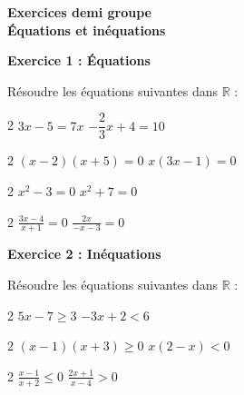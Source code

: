 \documentclass[12pt,a4paper]{exam}
\begin{document}
\begin{center}
    \Large\textbf{Exercices demi groupe\\Équations et inéquations}
\end{center}

\vspace{5pt}

\noindent
\textbf{Exercice 1 : Équations}

\vspace{5pt}
Résoudre les équations suivantes dans $\mathbb{R}$ :
\vspace{-5pt}
\begin{questions}
\begin{multicols}{2}
    \question $3x - 5 = 7x$
    \question $-\dfrac{2}{3}x + 4 = 10$
\end{multicols}
\vspace{5pt}
\begin{multicols}{2}
    \question $(x-2)(x+5)=0$
    \question $x(3x-1)=0$
\end{multicols}
\vspace{5pt}
\begin{multicols}{2}
    \question $x^2 -3 = 0$
    \question $x^2 + 7= 0$
\end{multicols}
\vspace{5pt}
\begin{multicols}{2}
    \question $\displaystyle \frac{3x-4}{x+1}=0$
    \question $\displaystyle \frac{2x}{-x-3}=0$
\end{multicols}
\end{questions}

\vspace{10pt}

\noindent
\textbf{Exercice 2 : Inéquations}

\vspace{5pt}
Résoudre les équations suivantes dans $\mathbb{R}$ :
\vspace{-5pt}
\begin{questions}
\begin{multicols}{2}
    \question $5x - 7 \ge 3$
    \question $-3x + 2 < 6$
\end{multicols}
\vspace{5pt}
\begin{multicols}{2}
    \question $(x-1)(x+3)\ge 0$
    \question $x(2-x)<0$
\end{multicols}
\vspace{5pt}
\begin{multicols}{2}
    \question $\displaystyle \frac{x-1}{x+2} \le 0$
    \question $\displaystyle \frac{2x+1}{x-4} > 0$
\end{multicols}
\end{questions}
\end{document}
